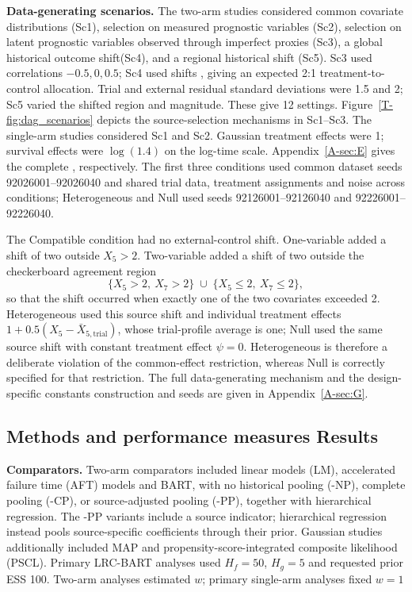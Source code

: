 \documentclass[11pt]{article}
\newcommand{\lrc}{LRC-BART} %
\theoremstyle{remark}\newtheorem{remark}{Remark}[section]
\providecommand{\DIFaddtex}[1]{{\protect\color{blue} \sf #1}} %
\providecommand{\DIFdeltex}[1]{{\protect\color{red} \scriptsize #1}} %
\providecommand{\DIFaddbegin}{} %
\providecommand{\DIFaddend}{} %
\providecommand{\DIFdelbegin}{} %
\providecommand{\DIFdelend}{} %
\providecommand{\DIFadd}[1]{\texorpdfstring{\DIFaddtex{#1}}{#1}} %
\providecommand{\DIFdel}[1]{\texorpdfstring{\DIFdeltex{#1}}{}} %
\begin{document}
\DIFdel{\textbf{Data-generating scenarios.}
The two-arm studies considered common covariate distributions (Sc1), selection on measured prognostic variables (Sc2), selection on latent prognostic variables observed through imperfect proxies (Sc3), a global historical outcome shift(Sc4), and a regional historical shift (Sc5). Sc3 used correlations $-0.5,0,0.5$; Sc4 used shifts }\DIFdelend \DIFaddbegin \DIFadd{, giving an expected 2:}\DIFaddend 1 \DIFaddbegin \DIFadd{treatment-to-control allocation. Trial and external residual standard deviations were 1.5 }\DIFaddend and \DIFdelbegin \DIFdel{2; Sc5 varied the shifted region
and magnitude. These give 12 settings. Figure~\ref{T-fig:dag_scenarios} depicts the source-selection mechanisms in Sc1--Sc3. The single-arm studies considered Sc1 and Sc2. Gaussian treatment effects were 1; survival effects were $\log(1.4)$ on the log-time scale. Appendix~\ref{A-sec:E} gives the complete }\DIFdelend \DIFaddbegin \DIFadd{1.8, respectively. The first three conditions used common dataset seeds 92026001--92026040 and shared trial data, treatment assignments and noise across conditions; Heterogeneous and Null used seeds 92126001--92126040 and 92226001--92226040.
}

\DIFadd{The Compatible condition had no external-control shift. One-variable added a shift of two outside $X_5>2$. Two-variable added a shift of two outside the checkerboard agreement region
}\[
 \{X_5>2,\ X_7>2\}\;\cup\;\{X_5\leq 2,\ X_7\leq 2\},
\]
\DIFadd{so that the shift occurred when exactly one of the two covariates exceeded 2. Heterogeneous used this source shift and individual treatment effects $1+0.5(X_5-\bar X_{5,\mathrm{trial}})$, whose trial-profile average is one; Null used the same source shift with constant treatment effect $\psi=0$. Heterogeneous is therefore a deliberate violation of the common-effect restriction, whereas Null is correctly specified for that restriction. The full }\DIFaddend data-generating \DIFdelbegin \DIFdel{mechanism and the design-specific constants}\DIFdelend \DIFaddbegin \DIFadd{construction and seeds are given in Appendix~\ref{A-sec:G}}\DIFaddend .

\subsection{\DIFdelbegin \DIFdel{Methods and performance measures}\DIFdelend \DIFaddbegin \DIFadd{Results}\DIFaddend }
\DIFdelbegin %
\DIFdel{\textbf{Comparators.}
Two-arm comparators included linear models (LM), accelerated failure time (AFT) models and BART, with no historical pooling (-NP), complete pooling (-CP), or source-adjusted pooling (-PP), together with hierarchical regression. The -PP variants include a source indicator; hierarchical regression instead pools source-specific coefficients through their prior. Gaussian studies additionally included MAP and propensity-score-integrated composite likelihood (PSCL). Primary \lrc{} analyses used $H_f=50$, $H_g=5$ and requested prior ESS 100. Two-arm analyses estimated $w$; primary single-arm analyses fixed $w=1$}\DIFdelend \DIFaddbegin 
\end{document}
